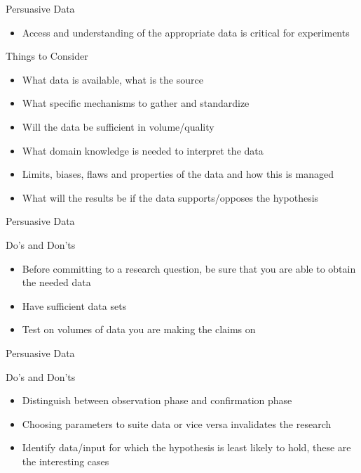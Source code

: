 \documentclass{beamer}
\begin{document}
\begin{frame}{Persuasive Data}
\begin{itemize}
\item Access and understanding of the appropriate data is critical for experiments
\end{itemize}
\begin{block}{Things to Consider}
\begin{itemize}
\item What data is available, what is the source
\item What specific mechanisms to gather and standardize
\item Will the data be sufficient in volume/quality
\item What domain knowledge is needed to interpret the data
\item Limits, biases, flaws and properties of the data and how this is managed
\item What will the results be if the data supports/opposes the hypothesis 
\end{itemize}
\end{block}
\end{frame}


\begin{frame}{Persuasive Data}
\begin{block}{Do's and Don'ts}

\begin{itemize}
\item Before committing to a research question, be sure that you are able to obtain the needed data
\item Have sufficient data sets
\item Test on volumes of data you are making the claims on
\end{itemize}

\end{block}
\end{frame}

\begin{frame}{Persuasive Data}
\begin{block}{Do's and Don'ts}

\begin{itemize}
\item Distinguish between observation phase and confirmation phase
\item Choosing parameters to suite data or vice versa invalidates the research
\item Identify data/input for which the hypothesis is least likely to hold, these are the interesting cases
\end{itemize}

\end{block}
\end{frame}
\end{document}
